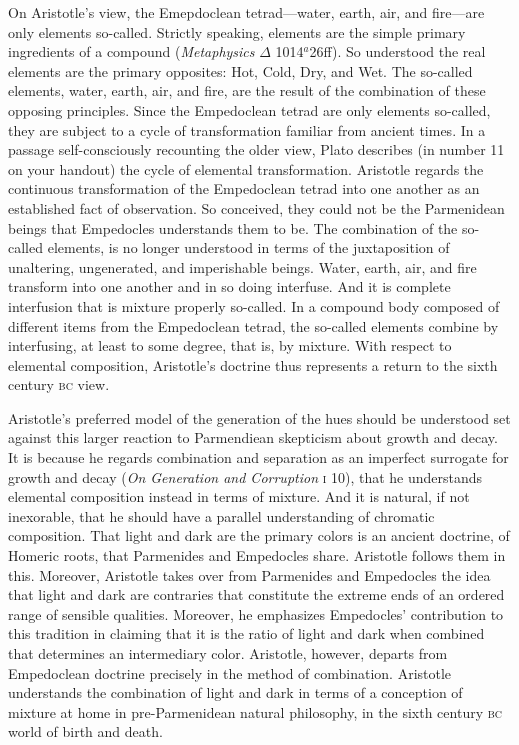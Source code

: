 On Aristotle's view, the Emepdoclean tetrad---water, earth, air, and fire---are only elements so-called. Strictly speaking, elements are the simple primary ingredients of a compound (\emph{Metaphysics} \( \Delta \) 1014\( ^{a} \)26ff). So understood the real elements are the primary opposites: Hot, Cold, Dry, and Wet. The so-called elements, water, earth, air, and fire, are the result of the combination of these opposing principles. Since the Empedoclean tetrad are only elements so-called, they are subject to a cycle of transformation familiar from ancient times. In a passage self-consciously recounting the older view, Plato describes  (in number 11 on your handout) the cycle of elemental transformation. Aristotle regards the continuous transformation of the Empedoclean tetrad into one another as an established fact of observation. So conceived, they could not be the Parmenidean beings that Empedocles understands them to be. The combination of the so-called elements, is no longer understood in terms of the juxtaposition of unaltering, ungenerated, and imperishable beings. Water, earth, air, and fire transform into one another and in so doing interfuse. And it is complete interfusion that is mixture properly so-called. In a compound body composed of different items from the Empedoclean tetrad, the so-called elements combine by interfusing, at least to some degree, that is, by mixture. With respect to elemental composition, Aristotle's doctrine thus represents a return to the sixth century \textsc{bc} view.

Aristotle's preferred model of the generation of the hues should be understood set against this larger reaction to Parmendiean skepticism about growth and decay. It is because he regards combination and separation as an imperfect surrogate for growth and decay (\emph{On Generation and Corruption} \textsc{i} 10), that he understands elemental composition instead in terms of mixture. And it is natural, if not inexorable, that he should have a parallel understanding of chromatic composition. That light and dark are the primary colors is an ancient doctrine, of Homeric roots, that Parmenides and Empedocles share. Aristotle follows them in this. Moreover, Aristotle takes over from Parmenides and Empedocles the idea that light and dark are contraries that constitute the extreme ends of an ordered range of sensible qualities. Moreover, he emphasizes Empedocles' contribution to this tradition in claiming that it is the ratio of light and dark when combined that determines an intermediary color. Aristotle, however, departs from Empedoclean doctrine precisely in the method of combination. Aristotle understands the combination of light and dark in terms of a conception of mixture at home in pre-Parmenidean natural philosophy, in the sixth century \textsc{bc} world of birth and death. 

